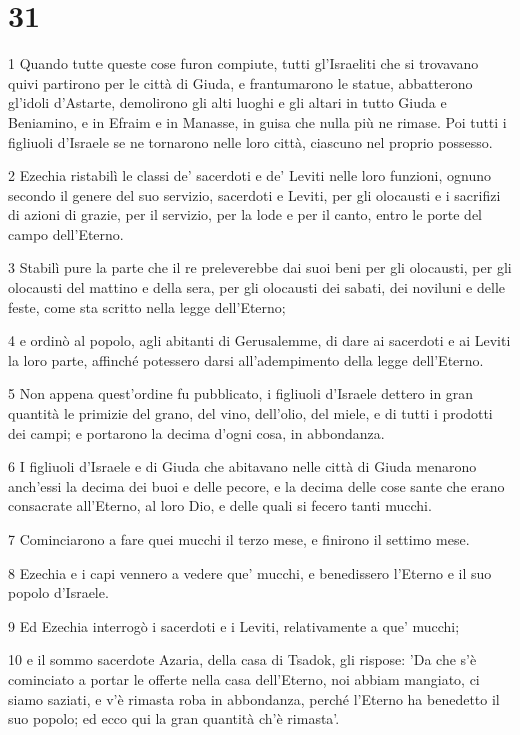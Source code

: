 \chapter{31}

\par 1 Quando tutte queste cose furon compiute, tutti gl'Israeliti che si trovavano quivi partirono per le città di Giuda, e frantumarono le statue, abbatterono gl'idoli d'Astarte, demolirono gli alti luoghi e gli altari in tutto Giuda e Beniamino, e in Efraim e in Manasse, in guisa che nulla più ne rimase. Poi tutti i figliuoli d'Israele se ne tornarono nelle loro città, ciascuno nel proprio possesso.
\par 2 Ezechia ristabilì le classi de' sacerdoti e de' Leviti nelle loro funzioni, ognuno secondo il genere del suo servizio, sacerdoti e Leviti, per gli olocausti e i sacrifizi di azioni di grazie, per il servizio, per la lode e per il canto, entro le porte del campo dell'Eterno.
\par 3 Stabilì pure la parte che il re preleverebbe dai suoi beni per gli olocausti, per gli olocausti del mattino e della sera, per gli olocausti dei sabati, dei noviluni e delle feste, come sta scritto nella legge dell'Eterno;
\par 4 e ordinò al popolo, agli abitanti di Gerusalemme, di dare ai sacerdoti e ai Leviti la loro parte, affinché potessero darsi all'adempimento della legge dell'Eterno.
\par 5 Non appena quest'ordine fu pubblicato, i figliuoli d'Israele dettero in gran quantità le primizie del grano, del vino, dell'olio, del miele, e di tutti i prodotti dei campi; e portarono la decima d'ogni cosa, in abbondanza.
\par 6 I figliuoli d'Israele e di Giuda che abitavano nelle città di Giuda menarono anch'essi la decima dei buoi e delle pecore, e la decima delle cose sante che erano consacrate all'Eterno, al loro Dio, e delle quali si fecero tanti mucchi.
\par 7 Cominciarono a fare quei mucchi il terzo mese, e finirono il settimo mese.
\par 8 Ezechia e i capi vennero a vedere que' mucchi, e benedissero l'Eterno e il suo popolo d'Israele.
\par 9 Ed Ezechia interrogò i sacerdoti e i Leviti, relativamente a que' mucchi;
\par 10 e il sommo sacerdote Azaria, della casa di Tsadok, gli rispose: 'Da che s'è cominciato a portar le offerte nella casa dell'Eterno, noi abbiam mangiato, ci siamo saziati, e v'è rimasta roba in abbondanza, perché l'Eterno ha benedetto il suo popolo; ed ecco qui la gran quantità ch'è rimasta'.
